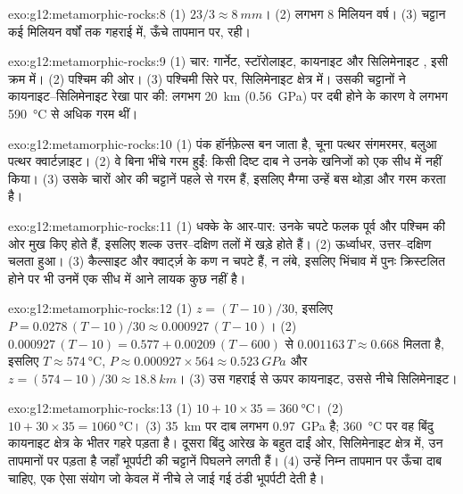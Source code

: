 \begin{solution}{exo:g12:metamorphic-rocks:8}
(1) $23/3 \approx \qty{8}{mm}$। (2) लगभग 8 मिलियन वर्ष। (3) चट्टान
कई मिलियन वर्षों तक गहराई में, ऊँचे तापमान पर, रही।
\end{solution}

\begin{solution}{exo:g12:metamorphic-rocks:9}
(1) चार: गार्नेट, स्टॉरोलाइट, कायनाइट और सिलिमेनाइट , इसी
क्रम में। (2) पश्चिम की ओर। (3) पश्चिमी सिरे पर, सिलिमेनाइट क्षेत्र में। उसकी
चट्टानों ने कायनाइट--सिलिमेनाइट रेखा पार की: लगभग \qty{20}{km}
(\qty{0.56}{GPa}) पर दबी होने के कारण वे लगभग \qty{590}{\celsius} से अधिक गरम थीं।
\end{solution}

\begin{solution}{exo:g12:metamorphic-rocks:10}
(1) पंक हॉर्नफ़ेल्स बन जाता है, चूना पत्थर संगमरमर, बलुआ पत्थर
क्वार्टज़ाइट। (2) वे बिना भींचे गरम हुईं: किसी दिष्ट दाब ने
उनके खनिजों को एक सीध में नहीं किया। (3) उसके चारों ओर की चट्टानें पहले से गरम हैं, इसलिए
मैग्मा उन्हें बस थोड़ा और गरम करता है।
\end{solution}

\begin{solution}{exo:g12:metamorphic-rocks:11}
(1) धक्के के आर-पार: उनके चपटे फलक पूर्व और पश्चिम की ओर मुख किए होते हैं, इसलिए शल्क
उत्तर--दक्षिण तलों में खड़े होते हैं। (2) ऊर्ध्वाधर, उत्तर--दक्षिण चलता हुआ।
(3) कैल्साइट और क्वार्ट्ज़ के कण न चपटे हैं, न लंबे, इसलिए भिंचाव में
पुनः क्रिस्टलित होने पर भी उनमें एक सीध में आने लायक कुछ नहीं है।
\end{solution}

\begin{solution}{exo:g12:metamorphic-rocks:12}
(1) $z = (T - 10)/30$, इसलिए $P = 0.0278\,(T - 10)/30 \approx
0.000927\,(T - 10)$। (2) $0.000927\,(T - 10) = 0.577 + 0.00209\,(T - 600)$
से $0.001163\,T \approx 0.668$ मिलता है, इसलिए $T \approx \qty{574}{\celsius}$, $P
\approx 0.000927 \times 564 \approx \qty{0.523}{GPa}$ और $z = (574 - 10)/30
\approx \qty{18.8}{km}$। (3) उस गहराई से ऊपर कायनाइट, उससे नीचे सिलिमेनाइट।
\end{solution}

\begin{solution}{exo:g12:metamorphic-rocks:13}
(1) $10 + 10 \times 35 = \qty{360}{\celsius}$। (2) $10 + 30 \times 35 =
\qty{1060}{\celsius}$। (3) \qty{35}{km} पर दाब लगभग
\qty{0.97}{GPa} है; \qty{360}{\celsius} पर वह बिंदु कायनाइट
क्षेत्र के भीतर गहरे पड़ता है। दूसरा बिंदु आरेख के बहुत दाईं ओर,
सिलिमेनाइट क्षेत्र में, उन तापमानों पर पड़ता है जहाँ भूपर्पटी की चट्टानें पिघलने लगती हैं।
(4) उन्हें निम्न तापमान पर ऊँचा दाब चाहिए, एक ऐसा संयोग जो केवल
 में नीचे ले जाई गई ठंडी भूपर्पटी देती है।
\end{solution}


